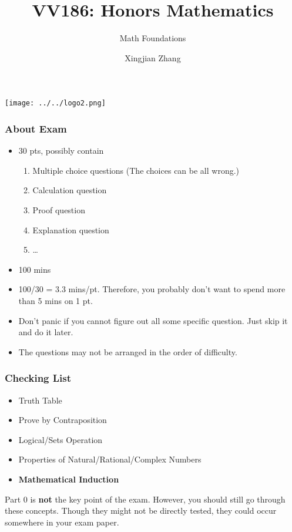 \documentclass[10pt, t]{beamer}
\title{VV186: Honors Mathematics}
\subtitle{\large Math Foundations}
\institute[UM-SJTU JI]{Univerity of Michigan-Shanghai Jiao Tong University Joint Institute}
\author{Xingjian Zhang}
\begin{document}
\begin{frame}
    \titlepage
    \begin{center}
        \texttt{[image: ../../logo2.png]}
    \end{center}
\end{frame}

\begin{frame}
    \frametitle{About Exam}
    \begin{itemize}
        \item 30 pts, possibly contain
        \begin{enumerate}
        \item Multiple choice questions (The choices can be all wrong.)
        \item Calculation question
        \item Proof question 
        \item Explanation question
        \item \dots
        \end{enumerate}
        \item 100 mins
        \item 100/30 = 3.3 mins/pt. Therefore, you probably don't want to spend more than 5 mins on 1 pt.
        \item Don't panic if you cannot figure out all some specific question. Just skip it and do it later.
        \item The questions may not be arranged in the order of difficulty.
    \end{itemize}
\end{frame}

\begin{frame}
    \frametitle{Checking List}
    \begin{itemize}
        \item Truth Table
        \item Prove by Contraposition
        \item Logical/Sets Operation
        \item Properties of Natural/Rational/Complex Numbers
        \item \textbf{Mathematical Induction}
    \end{itemize}
    Part 0 is \textbf{not} the key point of the exam. However, you should still go through these concepts. Though they might not be directly tested, they could occur somewhere in your exam paper.
\end{frame}
\end{document}
